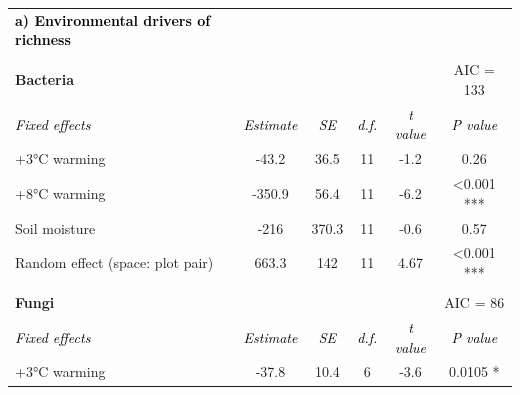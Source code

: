 \documentclass[
  letterpaper,
  DIV=11,
  numbers=noendperiod]{scrartcl}
\begin{document}
\begin{table}[H]
\begin{tabular}[t]{lccccc}
 &  &  &  &  & \\
\midrule
\begingroup\fontsize{9}{11}\selectfont \textcolor{black}{\textbf{a) Environmental drivers of richness}}\endgroup & \begingroup\fontsize{9}{11}\selectfont \textcolor{black}{\textbf{}}\endgroup & \begingroup\fontsize{9}{11}\selectfont \textcolor{black}{\textbf{}}\endgroup & \begingroup\fontsize{9}{11}\selectfont \textcolor{black}{\textbf{}}\endgroup & \begingroup\fontsize{9}{11}\selectfont \textcolor{black}{\textbf{}}\endgroup & \begingroup\fontsize{9}{11}\selectfont \textcolor{black}{\textbf{}}\endgroup\\
\addlinespace[-0.8em]
\multicolumn{6}{l}{\textbf{}}\\
\hspace{1em}\textbf{Bacteria} &  &  &  &  & AIC = 133\\
\midrule
\textcolor{black}{\em{\hspace{1em}Fixed effects}} & \textcolor{black}{\em{Estimate}} & \textcolor{black}{\em{SE}} & \textcolor{black}{\em{d.f.}} & \textcolor{black}{\em{t value}} & \textcolor{black}{\em{P \vphantom{5} value}}\\
\midrule
\hspace{1em}\hspace{1em}+3°C warming & -43.2 & 36.5 & 11 & -1.2 & 0.26\\
\hspace{1em}\hspace{1em}+8°C warming & -350.9 & 56.4 & 11 & -6.2 & <0.001 ***\\
\hspace{1em}\hspace{1em}Soil moisture & -216 & 370.3 & 11 & -0.6 & 0.57\\
\midrule
\hspace{1em}Random effect (space: plot pair) & 663.3 & 142 & 11 & 4.67 & <0.001 ***\\
\midrule
\addlinespace[-1em]
\multicolumn{6}{l}{\textbf{}}\\
\hspace{1em}\textbf{Fungi} &  &  &  &  & AIC = 86\\
\midrule
\textcolor{black}{\em{\hspace{1em}Fixed effects}} & \textcolor{black}{\em{Estimate}} & \textcolor{black}{\em{SE}} & \textcolor{black}{\em{d.f.}} & \textcolor{black}{\em{t value}} & \textcolor{black}{\em{P \vphantom{4} value}}\\
\midrule
\hspace{1em}\hspace{1em}+3°C warming & -37.8 & 10.4 & 6 & -3.6 & 0.0105 *\\

\end{tabular}
\end{table}
\end{document}
